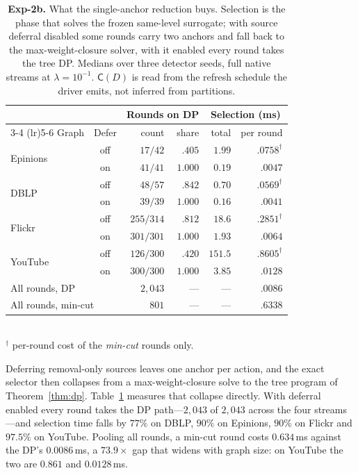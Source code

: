 \begin{table}[tb]\centering
\caption{\textbf{Exp-2b.} What the single-anchor reduction buys. Selection is the
phase that solves the frozen same-level surrogate; with source deferral disabled
some rounds carry two anchors and fall back to the max-weight-closure solver,
with it enabled every round takes the tree DP. Medians over three detector seeds,
full native streams at $\lambda=10^{-1}$. $\mathsf C(D)$ is read from the refresh
schedule the driver emits, not inferred from partitions.}
\label{tab:defer-seltime}
\begin{footnotesize}
\setlength{\tabcolsep}{0.35em}
\begin{tabular*}{\linewidth}{@{\extracolsep{\fill}}lcrrrr@{}}
\toprule
& & \multicolumn{2}{c}{Rounds on DP} & \multicolumn{2}{c}{Selection (ms)} \\
\cmidrule(lr){3-4} \cmidrule(lr){5-6}
Graph & Defer & count & share & total & per round \\
\midrule
\multirow{2}{*}{Epinions}
 & off & $17/42$   & $.405$  & $1.99$   & $.0758^{\dagger}$ \\
 & on  & $41/41$   & $1.000$ & $0.19$   & $.0047$ \\
\multirow{2}{*}{DBLP}
 & off & $48/57$   & $.842$  & $0.70$   & $.0569^{\dagger}$ \\
 & on  & $39/39$   & $1.000$ & $0.16$   & $.0041$ \\
\multirow{2}{*}{Flickr}
 & off & $255/314$ & $.812$  & $18.6$   & $.2851^{\dagger}$ \\
 & on  & $301/301$ & $1.000$ & $1.93$   & $.0064$ \\
\multirow{2}{*}{YouTube}
 & off & $126/300$ & $.420$  & $151.5$  & $.8605^{\dagger}$ \\
 & on  & $300/300$ & $1.000$ & $3.85$   & $.0128$ \\
\midrule
\multicolumn{2}{l}{All rounds, DP} & $2{,}043$ & --- & --- & $.0086$ \\
\multicolumn{2}{l}{All rounds, min-cut} & $801$ & --- & --- & $.6338$ \\
\bottomrule
\end{tabular*}
\end{footnotesize}
\\[2pt]
{\footnotesize $^{\dagger}$ per-round cost of the \emph{min-cut} rounds only.}
\end{table}

Deferring removal-only sources leaves one anchor per action, and the exact
selector then collapses from a max-weight-closure solve to the tree program of
Theorem~\ref{thm:dp}. Table~\ref{tab:defer-seltime} measures that collapse
directly. With deferral enabled every round takes the DP path---$2{,}043$ of
$2{,}043$ across the four streams---and selection time falls by $77\%$ on DBLP,
$90\%$ on Epinions, $90\%$ on Flickr and $97.5\%$ on YouTube. Pooling all rounds,
a min-cut round costs $0.634$\,ms against the DP's $0.0086$\,ms, a $73.9\times$
gap that widens with graph size: on YouTube the two are $0.861$ and
$0.0128$\,ms.

